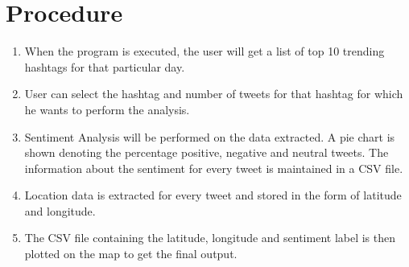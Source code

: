 \documentclass[12pt]{article}
\begin{document}
\section{Procedure}
\begin{enumerate}
\item When the program is executed, the user will get a list of top 10 trending hashtags for that particular day.
\item User can select the hashtag and number of tweets for that hashtag for which he wants to perform the analysis.
\item Sentiment Analysis will be performed on the data extracted. A pie chart is shown denoting the percentage positive, negative and neutral tweets. The information about the sentiment for every tweet is maintained in a CSV file.
\item Location data is extracted for every tweet and stored in the form of latitude and longitude.
\item The CSV file containing the latitude, longitude and sentiment label is then plotted on the map to get the final output.
\end{enumerate}
\newpage
\end{document}
